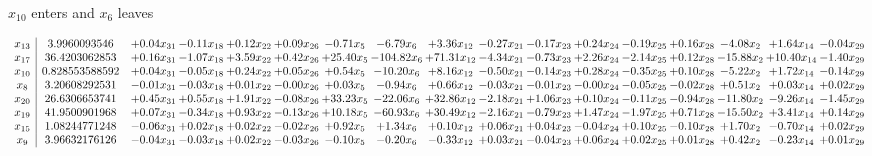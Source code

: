 \documentclass[9pt]{article}
\begin{document}
 $ x_{10} $ enters and $ x_{6} $ leaves 

 \[\begin{array}{c| c c@{\hskip 2pt} c@{\hskip 2pt} c@{\hskip 2pt} c@{\hskip 2pt} c@{\hskip 2pt} c@{\hskip 2pt} c@{\hskip 2pt} c@{\hskip 2pt} c@{\hskip 2pt} c@{\hskip 2pt} c@{\hskip 2pt} c@{\hskip 2pt} c@{\hskip 2pt} c@{\hskip 2pt} c@{\hskip 2pt} }
 x_{13}   &  3.9960093546 & +  0.04 x_{31} & -0.11 x_{18} & +  0.12 x_{22} & +  0.09 x_{26} & -0.71 x_{5} & -6.79 x_{6} & +  3.36 x_{12} & -0.27 x_{21} & -0.17 x_{23} & +  0.24 x_{24} & -0.19 x_{25} & +  0.16 x_{28} & -4.08 x_{2} & +  1.64 x_{14} & -0.04 x_{29}\\
 x_{17}   &  36.4203062853 & +  0.16 x_{31} & -1.07 x_{18} & +  3.59 x_{22} & +  0.42 x_{26} & + 25.40 x_{5} & -104.82 x_{6} & + 71.31 x_{12} & -4.34 x_{21} & -0.73 x_{23} & +  2.26 x_{24} & -2.14 x_{25} & +  0.12 x_{28} & -15.88 x_{2} & + 10.40 x_{14} & -1.40 x_{29}\\
 x_{10}   &  0.828553588592 & +  0.04 x_{31} & -0.05 x_{18} & +  0.24 x_{22} & +  0.05 x_{26} & +  0.54 x_{5} & -10.20 x_{6} & +  8.16 x_{12} & -0.50 x_{21} & -0.14 x_{23} & +  0.28 x_{24} & -0.35 x_{25} & +  0.10 x_{28} & -5.22 x_{2} & +  1.72 x_{14} & -0.14 x_{29}\\
 x_{8}   &  3.20608292531 & -0.01 x_{31} & -0.03 x_{18} & +  0.01 x_{22} & -0.00 x_{26} & +  0.03 x_{5} & -0.94 x_{6} & +  0.66 x_{12} & -0.03 x_{21} & -0.01 x_{23} & -0.00 x_{24} & -0.05 x_{25} & -0.02 x_{28} & +  0.51 x_{2} & +  0.03 x_{14} & +  0.02 x_{29}\\
 x_{20}   &  26.6306653741 & +  0.45 x_{31} & +  0.55 x_{18} & +  1.91 x_{22} & -0.08 x_{26} & + 33.23 x_{5} & -22.06 x_{6} & + 32.86 x_{12} & -2.18 x_{21} & +  1.06 x_{23} & +  0.10 x_{24} & -0.11 x_{25} & -0.94 x_{28} & -11.80 x_{2} & -9.26 x_{14} & -1.45 x_{29}\\
 x_{19}   &  41.9500901968 & +  0.07 x_{31} & -0.34 x_{18} & +  0.93 x_{22} & -0.13 x_{26} & + 10.18 x_{5} & -60.93 x_{6} & + 30.49 x_{12} & -2.16 x_{21} & -0.79 x_{23} & +  1.47 x_{24} & -1.97 x_{25} & +  0.71 x_{28} & -15.50 x_{2} & +  3.41 x_{14} & +  0.14 x_{29}\\
 x_{15}   &  1.08244771248 & -0.06 x_{31} & +  0.02 x_{18} & +  0.02 x_{22} & -0.02 x_{26} & +  0.92 x_{5} & +  1.34 x_{6} & +  0.10 x_{12} & +  0.06 x_{21} & +  0.04 x_{23} & -0.04 x_{24} & +  0.10 x_{25} & -0.10 x_{28} & +  1.70 x_{2} & -0.70 x_{14} & +  0.02 x_{29}\\
 x_{9}   &  3.96632176126 & -0.04 x_{31} & -0.03 x_{18} & +  0.02 x_{22} & -0.03 x_{26} & -0.10 x_{5} & -0.20 x_{6} & -0.33 x_{12} & +  0.03 x_{21} & -0.04 x_{23} & +  0.06 x_{24} & +  0.02 x_{25} & +  0.01 x_{28} & +  0.42 x_{2} & -0.23 x_{14} & +  0.01 x_{29}\\

\end{array}\]
\end{document}
